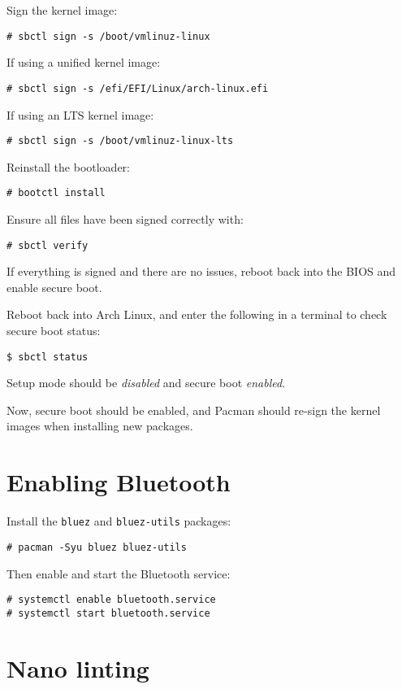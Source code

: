 \documentclass[a4paper]{article}
\begin{document}
Sign the kernel image:
\begin{lstlisting}
# sbctl sign -s /boot/vmlinuz-linux
\end{lstlisting}
If using a unified kernel image:
\begin{lstlisting}
# sbctl sign -s /efi/EFI/Linux/arch-linux.efi
\end{lstlisting}
If using an LTS kernel image:
\begin{lstlisting}
# sbctl sign -s /boot/vmlinuz-linux-lts
\end{lstlisting}

Reinstall the bootloader:
\begin{lstlisting}
# bootctl install
\end{lstlisting}

Ensure all files have been signed correctly with:
\begin{lstlisting}
# sbctl verify
\end{lstlisting}

If everything is signed and there are no issues, reboot back into the BIOS and enable secure boot.

Reboot back into Arch Linux, and enter the following in a terminal to check secure boot status:
\begin{lstlisting}
$ sbctl status
\end{lstlisting}

Setup mode should be \emph{disabled} and secure boot \emph{enabled}.

Now, secure boot should be enabled, and Pacman should re-sign the kernel images when installing new packages.

\section{Enabling Bluetooth}

Install the \lstinline|bluez| and \lstinline|bluez-utils| packages:
\begin{lstlisting}
# pacman -Syu bluez bluez-utils
\end{lstlisting}

Then enable and start the Bluetooth service:
\begin{lstlisting}
# systemctl enable bluetooth.service
# systemctl start bluetooth.service
\end{lstlisting}

\section{Nano linting}
\end{document}
